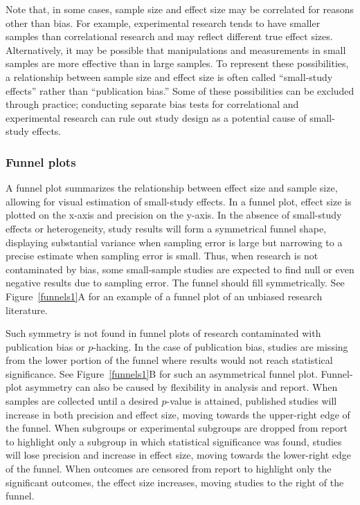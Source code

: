\documentclass[man]{apa6}
\begin{document}
Note that, in some cases, sample size and effect size may be correlated for reasons other than bias. For example, experimental research tends to have smaller samples than correlational research and may reflect different true effect sizes. Alternatively, it may be possible that manipulations and measurements in small samples are more effective than in large samples. To represent these possibilities, a relationship between sample size and effect size is often called ``small-study effects'' rather than ``publication bias.'' Some of these possibilities can be excluded through practice; conducting separate bias tests for correlational and experimental research can rule out study design as a potential cause of small-study effects.

\subsubsection{Funnel plots}
A funnel plot summarizes the relationship between effect size and sample size, allowing for visual estimation of small-study effects. In a funnel plot, effect size is plotted on the x-axis and precision on the y-axis. In the absence of small-study effects or heterogeneity, study results will form a symmetrical funnel shape, displaying substantial variance when sampling error is large but narrowing to a precise estimate when sampling error is small. Thus, when research is not contaminated by bias, some small-sample studies are expected to find null or even negative results due to sampling error. The funnel should fill symmetrically. See Figure~\ref{funnels1}A for an example of a funnel plot of an unbiased research literature.

Such symmetry is not found in funnel plots of research contaminated with publication bias or $p$-hacking.  In the case of publication bias, studies are missing from the lower portion of the funnel where results would not reach statistical significance. See Figure~\ref{funnels1}B for such an asymmetrical funnel plot. Funnel-plot asymmetry can also be caused by flexibility in analysis and report. When samples are collected until a desired $p$-value is attained, published studies will increase in both precision and effect size, moving towards the upper-right edge of the funnel. When subgroups or experimental subgroups are dropped from report to highlight only a subgroup in which statistical significance was found, studies will lose precision and increase in effect size, moving towards the lower-right edge of the funnel. When outcomes are censored from report to highlight only the significant outcomes, the effect size increases, moving studies to the right of the funnel.   %
\end{document}
